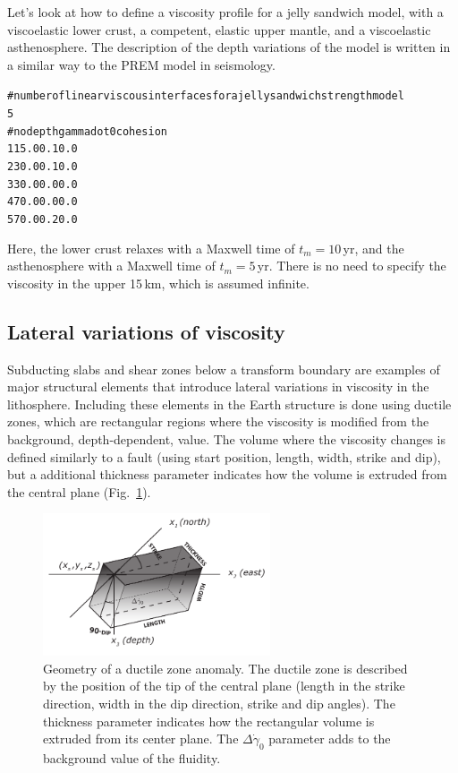 \documentclass[10pt]{article}
\begin{document}
Let's look at how to define a viscosity profile for a jelly sandwich model, with a viscoelastic lower crust, a competent, elastic upper mantle, and a viscoelastic asthenosphere. The description of the depth variations of the model is written in a similar way to the PREM model in seismology.
\begin{alltt}
# number of linear viscous interfaces for a jelly sandwich strength model
{\color{orange}5}
# no depth gammadot0 cohesion
{\color{orange}   1  15.0       0.1      0.0}
{\color{orange}   2  30.0       0.1      0.0}
{\color{orange}   3  30.0       0.0      0.0}
{\color{orange}   4  70.0       0.0      0.0}
{\color{orange}   5  70.0       0.2      0.0}
\end{alltt}
Here, the lower crust relaxes with a Maxwell time of $t_m=10\,$yr, and the asthenosphere with a Maxwell time of $t_m=5\,$yr. There is no need to specify the viscosity in the upper 15\,km, which is assumed infinite.




\subsection{Lateral variations of viscosity}
Subducting slabs and shear zones below a transform boundary are examples of major structural elements that introduce lateral variations in viscosity in the lithosphere. Including these elements in the Earth structure is done using ductile zones, which are rectangular regions where the viscosity is modified from the background, depth-dependent, value. The volume where the viscosity changes is defined similarly to a fault (using start position, length, width, strike and dip), but a additional thickness parameter indicates how the volume is extruded from the central plane (Fig.~\ref{fig:geologic_zone}).

%
\begin{figure}[h]
\centering\includegraphics[width=0.6\textwidth]{geologic_zone.pdf}
\caption{Geometry of a ductile zone anomaly. The ductile zone is described by the position of the tip of the central plane (length in the strike direction, width in the dip direction, strike and dip angles). The thickness parameter indicates how the rectangular volume is extruded from its center plane. The $\Delta\dot{\gamma}_0$ parameter adds to the background value of the fluidity.}
\label{fig:geologic_zone}
\end{figure}
%
\end{document}
